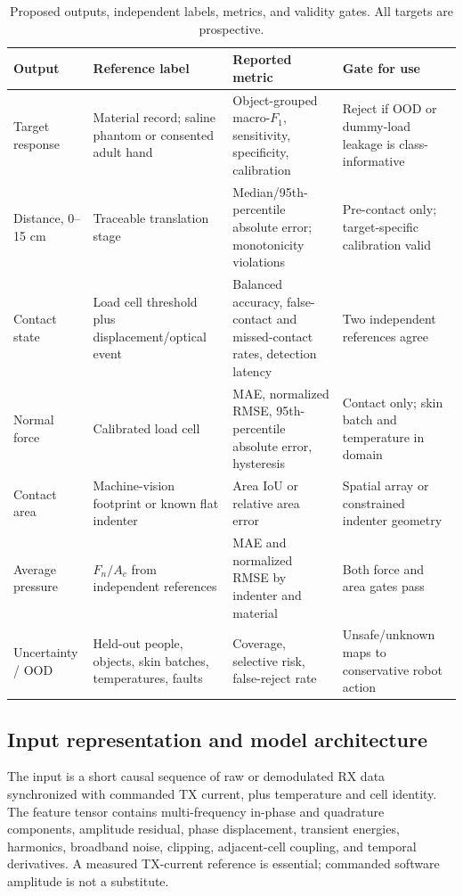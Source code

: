 \documentclass[10pt]{article}
\begin{document}
\begin{table}[t]
\centering\small
\caption{Proposed outputs, independent labels, metrics, and validity gates. All targets are prospective.}
\label{tab:aioutputs}
\begin{tabularx}{\textwidth}{@{}p{2.2cm}p{3.1cm}X p{3.0cm}@{}}
\toprule
Output & Reference label & Reported metric & Gate for use\\
\midrule
Target response & Material record; saline phantom or consented adult hand & Object-grouped macro-$F_1$, sensitivity, specificity, calibration & Reject if OOD or dummy-load leakage is class-informative\\
Distance, 0--15 cm & Traceable translation stage & Median/95th-percentile absolute error; monotonicity violations & Pre-contact only; target-specific calibration valid\\
Contact state & Load cell threshold plus displacement/optical event & Balanced accuracy, false-contact and missed-contact rates, detection latency & Two independent references agree\\
Normal force & Calibrated load cell & MAE, normalized RMSE, 95th-percentile absolute error, hysteresis & Contact only; skin batch and temperature in domain\\
Contact area & Machine-vision footprint or known flat indenter & Area IoU or relative area error & Spatial array or constrained indenter geometry\\
Average pressure & $F_n/A_c$ from independent references & MAE and normalized RMSE by indenter and material & Both force and area gates pass\\
Uncertainty / OOD & Held-out people, objects, skin batches, temperatures, faults & Coverage, selective risk, false-reject rate & Unsafe/unknown maps to conservative robot action\\
\bottomrule
\end{tabularx}
\end{table}

\subsection{Input representation and model architecture}
The input is a short causal sequence of raw or demodulated RX data synchronized with commanded TX current, plus temperature and cell identity. The feature tensor contains multi-frequency in-phase and quadrature components, amplitude residual, phase displacement, transient energies, harmonics, broadband noise, clipping, adjacent-cell coupling, and temporal derivatives. A measured TX-current reference is essential; commanded software amplitude is not a substitute.
\end{document}
